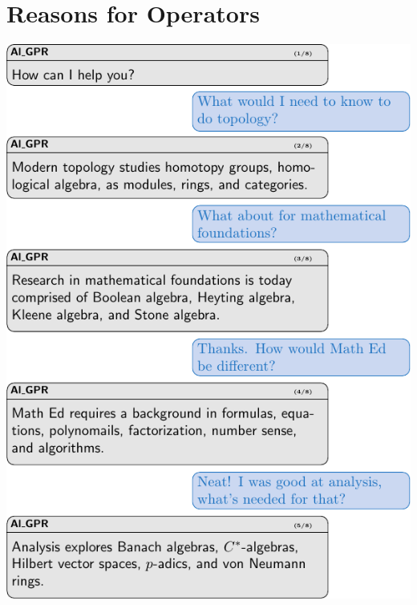 



\chapter{Reasons for Operators}
\includegraphics[height=0.9\textheight]{6-operators/AlGPR.pdf}
\newpage
